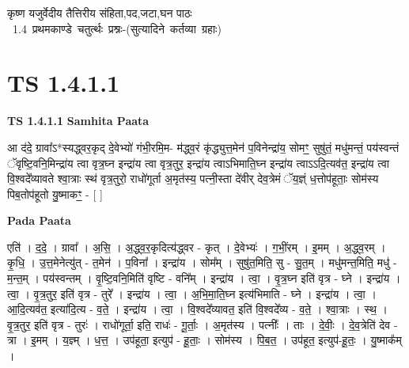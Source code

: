 \documentclass[17pt]{extarticle}
\begin{document}
\begin{titlepage}
    \begin{center}
 
\begin{sanskrit}
    { \Huge
    कृष्ण यजुर्वेदीय तैत्तिरीय संहिता,पद,जटा,घन पाठः 
    }
    \\
    \vspace{2.5cm}
    \mbox{ \Huge
    1.4     प्रथमकाण्डे चतुर्त्थः प्रश्नः-(सुत्यादिने कर्तव्या ग्रहाः)   }
\end{sanskrit}
\end{center}

\end{titlepage}
\tableofcontents
\pagebreak

\section*{ TS 1.4.1.1 }

\textbf{TS 1.4.1.1 } \newline
\textbf{Samhita Paata} \newline

आ द॑दे॒ ग्रावा᳚ऽ*स्यद्ध्वर॒कृद् दे॒वेभ्यो॑ गंभी॒रमि॒म- म॑द्ध्व॒रं कृ॑द्ध्युत्त॒मेन॑ प॒विनेन्द्रा॑य॒ सोमꣳ॒॒ सुषु॑तं॒ मधु॑मन्तं॒ पय॑स्वन्तं ॅवृष्टि॒वनि॒मिन्द्रा॑य त्वा वृत्र॒घ्न इन्द्रा॑य त्वा वृत्र॒तुर॒ इन्द्रा॑य त्वाऽभिमाति॒घ्न इन्द्रा॑य त्वाऽऽदि॒त्यव॑त॒ इन्द्रा॑य त्वा वि॒श्वदे᳚व्यावते श्वा॒त्राः स्थ॑ वृत्र॒तुरो॒ राधो॑गूर्ता अ॒मृत॑स्य॒ पत्नी॒स्ता दे॑वीर् देव॒त्रेमं ॅय॒ज्ञ्ं ध॒त्तोप॑हूताः॒ सोम॑स्य पिब॒तोप॑हूतो यु॒ष्माकꣳ॒॒ - [ ] \newline

\textbf{Pada Paata} \newline

एति॑ । द॒दे॒ । ग्रावा᳚ । अ॒सि॒ । अ॒द्ध्व॒र॒कृदित्य॑द्ध्वर - कृत् । दे॒वेभ्यः॑ । ग॒भीं॒रम् । इ॒मम् । अ॒द्ध्व॒रम् । कृ॒धि॒ । उ॒त्त॒मेनेत्यु॑त् - त॒मेन॑ । प॒विना᳚ । इन्द्रा॑य । सोम᳚म् । सुषु॑त॒मिति॒ सु - सु॒त॒म् । मधु॑मन्त॒मिति॒ मधु॑ - म॒न्त॒म् । पय॑स्वन्तम् । वृ॒ष्टि॒वनि॒मिति॑ वृष्टि - वनि᳚म् । इन्द्रा॑य । त्वा॒ । वृ॒त्र॒घ्न इति॑ वृत्र - घ्ने । इन्द्रा॑य । त्वा॒ । वृ॒त्र॒तुर॒ इति॑ वृत्र - तुरे᳚ । इन्द्रा॑य । त्वा॒ । अ॒भि॒मा॒ति॒घ्न इत्य॑भिमाति - घ्ने । इन्द्रा॑य । त्वा॒ । आ॒दि॒त्यव॑त॒ इत्या॑दि॒त्य - व॒ते॒ । इन्द्रा॑य । त्वा॒ । वि॒श्वदे᳚व्यावत॒ इति॑ वि॒श्वदे᳚व्य - व॒ते॒ । श्वा॒त्राः । स्थ॒ । वृ॒त्र॒तुर॒ इति॑ वृत्र - तुरः॑ । राधो॑गूर्ता॒ इति॒ राधः॑ - गू॒र्ताः॒ । अ॒मृत॑स्य । पत्नीः᳚ । ताः । दे॒वीः॒ । दे॒व॒त्रेति॑ देव - त्रा । इ॒मम् । य॒ज्ञ्म् । ध॒त्त॒ । उप॑हूता॒ इत्युप॑ - हू॒ताः॒ । सोम॑स्य । पि॒ब॒त॒ । उप॑हूत॒ इत्युप॑-हू॒तः॒ । यु॒ष्माक᳚म् ।  \newline
\end{document}
